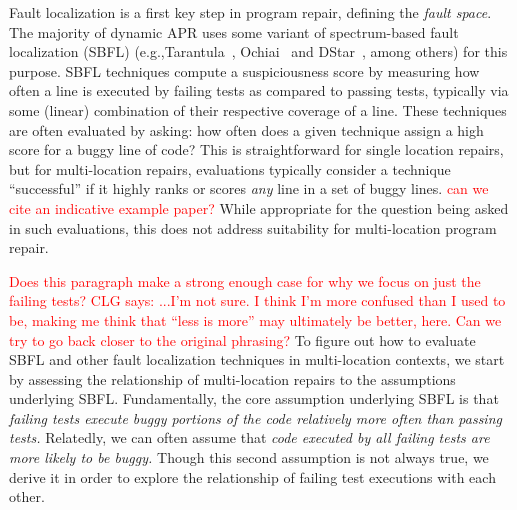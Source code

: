 \documentclass[10pt, conference]{IEEEtran}
\newcommand\todo[1]{\textcolor{red}{#1}}
\begin{document}
Fault localization is a first key step in program repair, defining the
\emph{fault space}. The majority of dynamic APR
uses some variant of spectrum-based fault localization (SBFL) (e.g.,Tarantula~\cite{tarantula},
Ochiai~\cite{ochiai} and DStar~\cite{wong2013dstar}, among others) for this purpose.
%
SBFL techniques compute a suspiciousness score by
measuring how often a line is executed by failing tests as compared to passing
tests, typically via some (linear) combination of their respective
coverage of a line. 
These techniques are often evaluated by asking: how often does a given technique assign a high 
score for a buggy line of code? This is straightforward for single location repairs, but for 
multi-location repairs, evaluations
typically consider a technique ``successful'' if it highly ranks or scores \emph{any} line in a
set of buggy lines. \todo{can we cite an indicative example paper?}
While appropriate for the question being asked in such evaluations, this does not address
suitability for multi-location program repair.%

\todo{Does this paragraph make a strong enough case for why we focus on just the failing 
tests?}
\todo{CLG says: ...I'm not sure.  I think I'm more confused than I used to be,
  making me think that ``less is more'' may ultimately be better, here.  Can we
  try to go back closer to the original phrasing?}
To figure out how to evaluate SBFL and other fault localization techniques 
in multi-location contexts, we start by assessing the 
relationship of multi-location repairs to the assumptions underlying SBFL. 
Fundamentally, the core assumption underlying SBFL is that \emph{failing tests
execute buggy portions of the code relatively more often than passing tests.} Relatedly, we can 
often assume that \emph{code executed by all failing tests are more likely to be buggy.} Though 
this second assumption is not 
always true, we derive it in order to explore the relationship of failing test executions with each 
other.
\end{document}
